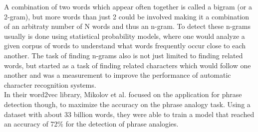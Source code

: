 A combination of two words which appear often together is called a bigram (or a 2-gram), but more words than just 2 could be involved making it a combination of an arbitraty number of N words and thus an n-gram. To detect these n-grams usually is done using statistical probability models, where one would analyze a given corpus of words to understand what words frequently occur close to each another\cite{suen_n-gram_1979}. The task of finding n-grams also is not just limited to finding related words, but started as a task of finding related characters which would follow one another\cite{cavnar_n-gram-based_nodate} and was a measurement to improve the performance of automatic character recognition systems\cite{suen_n-gram_1979}.\\
In their word2vec library, Mikolov et al. focused on the application for phrase detection though, to maximize the accuracy on the phrase analogy task. Using a dataset with about 33 billion words, they were able to train a model that reached an accuracy of 72\% for the detection of phrase analogies\cite[p6]{mikolov_distributed_2013}.

